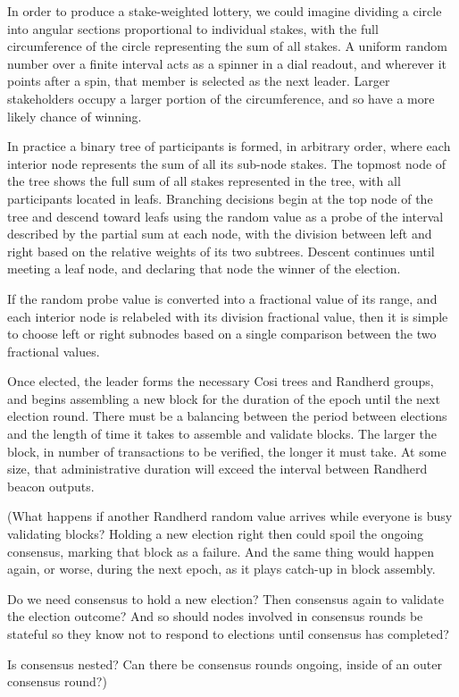 \documentclass{yellowpaper}
\begin{document}
In order to produce a stake-weighted lottery, we could imagine dividing a circle into angular sections proportional to individual stakes, with the full circumference of the circle representing the sum of all stakes. A uniform random number over a finite interval acts as a spinner in a dial readout, and wherever it points after a spin, that member is selected as the next leader. Larger stakeholders occupy a larger portion of the circumference, and so have a more likely chance of winning.

In practice a binary tree of participants is formed, in arbitrary order, where each interior node represents the sum of all its sub-node stakes. The topmost node of the tree shows the full sum of all stakes represented in the tree, with all participants located in leafs. Branching decisions begin at the top node of the tree and descend toward leafs using the random value as a probe of the interval described by the partial sum at each node, with the division between left and right based on the relative weights of its two subtrees. Descent continues until meeting a leaf node, and declaring that node the winner of the election. 

If the random probe value is converted into a fractional value of its range, and each interior node is relabeled with its division fractional value, then it is simple to choose left or right subnodes based on a single comparison between the two fractional values.

Once elected, the leader forms the necessary Cosi trees and Randherd groups, and begins assembling a new block for the duration of the epoch until the next election round. There must be a balancing between the period between elections and the length of time it takes to assemble and validate blocks. The larger the block, in number of transactions to be verified, the longer it must take. At some size, that administrative duration will exceed the interval between Randherd beacon outputs.
$$
$$
{\em{(What happens if another Randherd random value arrives while everyone is busy validating blocks? Holding a new election right then could spoil the ongoing consensus, marking that block as a failure. And the same thing would happen again, or worse, during the next epoch, as it plays catch-up in block assembly. 

Do we need consensus to hold a new election? Then consensus again to validate the election outcome? And so should nodes involved in consensus rounds be stateful so they know not to respond to elections until consensus has completed?

Is consensus nested? Can there be consensus rounds ongoing, inside of an outer consensus round?)}}
$$
$$
\end{document}
